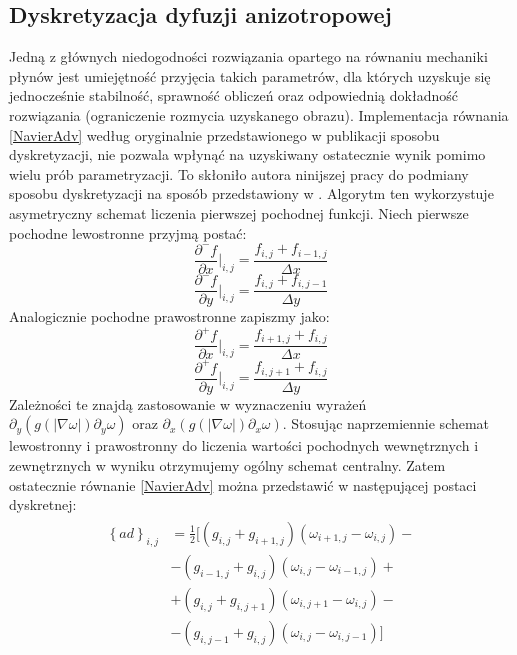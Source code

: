 \documentclass[12pt, twoside, openany]{report}
\theoremstyle{definition}
\begin{document}
\subsection{Dyskretyzacja dyfuzji anizotropowej}
Jedną z głównych niedogodności rozwiązania opartego na równaniu mechaniki płynów jest umiejętność przyjęcia takich parametrów, dla których uzyskuje się jednocześnie stabilność, sprawność obliczeń oraz odpowiednią dokładność rozwiązania (ograniczenie rozmycia uzyskanego obrazu). Implementacja równania \eqref{NavierAdv} według oryginalnie przedstawionego w publikacji \cite{au2001image} sposobu dyskretyzacji, nie pozwala wpłynąć na uzyskiwany ostatecznie wynik pomimo wielu prób parametryzacji. To skłoniło autora ninijszej pracy do podmiany sposobu dyskretyzacji na sposób przedstawiony w \cite{van2005algorithms}. Algorytm ten wykorzystuje asymetryczny schemat liczenia pierwszej pochodnej funkcji. Niech pierwsze pochodne lewostronne przyjmą postać:
\begin{equation}
\frac{\partial^-f}{\partial x}\bigg|_{i,j}=\frac{f_{i,j}+f_{i-1,j}}{\Delta x}
\label{leftdfdx}
\end{equation}
\begin{equation}
{\frac{{\partial }^-f}{\partial y}}\bigg|_{i,j}=\frac{f_{i,j}+f_{i,j-1}}{\Delta y}
\label{leftdfdy}
\end{equation}
Analogicznie pochodne prawostronne zapiszmy jako:
\begin{equation}
{\frac{{\partial }^+f}{\partial x}}\bigg|_{i,j}=\frac{f_{i+1,j}+f_{i,j}}{\Delta x} 
\label{rightdfdx}
\end{equation}
\begin{equation}
{\frac{{\partial }^+f}{\partial y}}\bigg|_{i,j}=\frac{f_{i,j+1}+f_{i,j}}{\Delta y}
\label{rightdfdy}
\end{equation}
Zależności te znajdą zastosowanie w wyznaczeniu wyrażeń \\
${\partial }_y\left(g\left(\left|\nabla \omega \right|\right){\partial }_y\omega \right)$ oraz
${\partial }_x\left(g\left(\left|\nabla \omega \right|\right){\partial }_x\omega \right)$. Stosując naprzemiennie schemat lewostronny i prawostronny do liczenia wartości pochodnych wewnętrznych i zewnętrznych w wyniku otrzymujemy ogólny schemat centralny. Zatem ostatecznie równanie \eqref{NavierAdv} można przedstawić w następującej postaci dyskretnej:
\begin{align}
\begin{aligned}
{\left\{ad\right\}}_{i,j}
&= \frac{1}{2}\biggl[\left(g_{i,j}+g_{i+1,j}\right)\left({\omega }_{i+1,j}-{\omega }_{i,j}\right) -\\[1ex]
&- \left(g_{i-1,j}+g_{i,j}\right)\left({\omega }_{i,j}-{\omega }_{i-1,j}\right) +  \\[1ex]
&+ \left(g_{i,j}+g_{i,j+1}\right)\left({\omega }_{i,j+1}-{\omega }_{i,j}\right) -\\[1ex]
&- \left(g_{i,j-1}+g_{i,j}\right)\left({\omega }_{i,j}-{\omega }_{i,j-1}\right)\biggl]
\end{aligned}
\label{discreteAnisotropic2}
\end{align}
\end{document}
